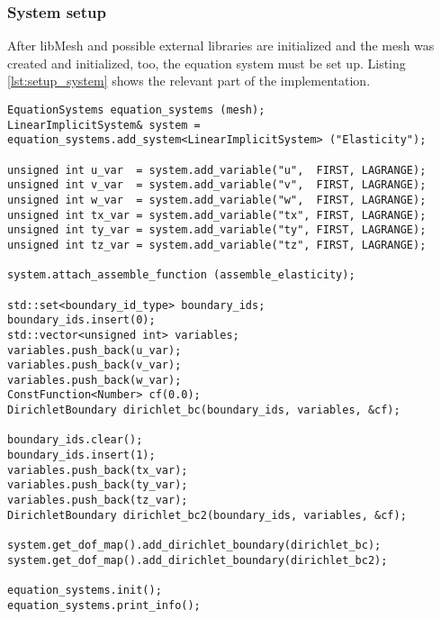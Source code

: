   \subsubsection{System setup}\label{sec:Impl-Details-SystemSetup}
  After libMesh and possible external libraries are initialized and the mesh was created and initialized, too, the equation system must be set up. Listing \ref{lst:setup_system} shows the relevant part of the implementation.
\begin{lstlisting}[caption=Setting up the equation system,label=lst:setup_system,keepspaces=true]
EquationSystems equation_systems (mesh);
LinearImplicitSystem& system = equation_systems.add_system<LinearImplicitSystem> ("Elasticity");

unsigned int u_var  = system.add_variable("u",  FIRST, LAGRANGE);
unsigned int v_var  = system.add_variable("v",  FIRST, LAGRANGE);
unsigned int w_var  = system.add_variable("w",  FIRST, LAGRANGE);
unsigned int tx_var = system.add_variable("tx", FIRST, LAGRANGE);
unsigned int ty_var = system.add_variable("ty", FIRST, LAGRANGE);
unsigned int tz_var = system.add_variable("tz", FIRST, LAGRANGE);

system.attach_assemble_function (assemble_elasticity);

std::set<boundary_id_type> boundary_ids;
boundary_ids.insert(0);
std::vector<unsigned int> variables;
variables.push_back(u_var);
variables.push_back(v_var);
variables.push_back(w_var);
ConstFunction<Number> cf(0.0);
DirichletBoundary dirichlet_bc(boundary_ids, variables, &cf);

boundary_ids.clear();
boundary_ids.insert(1);
variables.push_back(tx_var);
variables.push_back(ty_var);
variables.push_back(tz_var);
DirichletBoundary dirichlet_bc2(boundary_ids, variables, &cf);

system.get_dof_map().add_dirichlet_boundary(dirichlet_bc);
system.get_dof_map().add_dirichlet_boundary(dirichlet_bc2);

equation_systems.init();
equation_systems.print_info();
\end{lstlisting}
